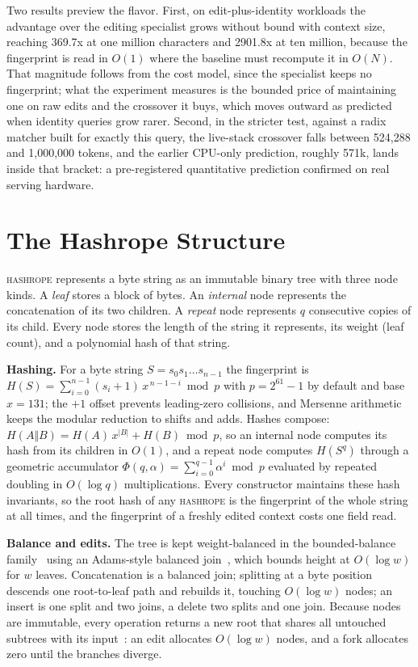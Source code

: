 \documentclass[10pt,conference]{IEEEtran}
\newcommand{\hr}{\textsc{hashrope}}
\begin{document}
Two results preview the flavor. First, on edit-plus-identity workloads
the advantage over the editing specialist grows without bound with
context size, reaching 369.7x at one million characters and 2901.8x at
ten million, because the fingerprint is read in $O(1)$ where the
baseline must recompute it in $O(N)$. That magnitude follows from the
cost model, since the specialist keeps no fingerprint; what the
experiment measures is the bounded price of maintaining one on raw
edits and the crossover it buys, which moves outward as predicted when
identity queries grow rarer. Second, in the stricter test, against a
radix matcher built for exactly this query, the live-stack crossover
falls between 524{,}288 and 1{,}000{,}000 tokens, and the earlier
CPU-only prediction, roughly 571k, lands inside that bracket: a
pre-registered quantitative prediction confirmed on real serving
hardware.

\section{The Hashrope Structure}\label{sec:structure}

\hr{} represents a byte string as an immutable binary tree with three
node kinds. A \emph{leaf} stores a block of bytes. An \emph{internal}
node represents the concatenation of its two children. A \emph{repeat}
node represents $q$ consecutive copies of its child. Every node stores
the length of the string it represents, its weight (leaf count), and a
polynomial hash of that string.

\textbf{Hashing.} For a byte string $S = s_0 s_1 \ldots s_{n-1}$ the
fingerprint is
$H(S) = \sum_{i=0}^{n-1} (s_i + 1)\, x^{\,n-1-i} \bmod p$
with $p = 2^{61}-1$ by default and base $x = 131$; the $+1$ offset
prevents leading-zero collisions, and Mersenne arithmetic keeps the
modular reduction to shifts and adds. Hashes compose: $H(A \Vert B) =
H(A)\, x^{|B|} + H(B) \bmod p$, so an internal node computes its hash
from its children in $O(1)$, and a repeat node computes
$H(S^q)$ through a geometric accumulator
$\Phi(q,\alpha) = \sum_{i=0}^{q-1}\alpha^i \bmod p$ evaluated by
repeated doubling in $O(\log q)$ multiplications. Every constructor
maintains these hash invariants, so the root hash of any \hr{} is the
fingerprint of the whole string at all times, and the fingerprint of a
freshly edited context costs one field read.

\textbf{Balance and edits.} The tree is kept weight-balanced in the
bounded-balance family~\cite{nievergelt1973bounded} using an Adams-style
balanced join~\cite{adams1993efficient}, which bounds height at
$O(\log w)$ for $w$ leaves. Concatenation is a balanced join; splitting
at a byte position descends one root-to-leaf path and rebuilds it,
touching $O(\log w)$ nodes; an insert is one split and two joins, a
delete two splits and one join. Because nodes are immutable, every
operation returns a new root that shares all untouched subtrees with
its input~\cite{driscoll1989persistent}: an edit allocates $O(\log w)$
nodes, and a fork allocates zero until the branches diverge.
\end{document}
